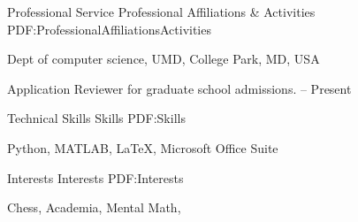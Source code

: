 \documentclass[letterpaper,MMMyyyy,nonstopmode]{simpleresumecv}
\begin{document}
\begin{Body}
{{%

\Section
{Professional Service}
{Professional Affiliations \& Activities}
{PDF:ProfessionalAffiliationsActivities}

\Entry
{Dept of computer science, UMD},
\newline
College Park, MD, USA

\Gap
\BulletItem
Application Reviewer for graduate school admissions.
\hfill
{} --
Present









\Section
{Technical Skills}
{Skills}
{PDF:Skills}

\Entry
Python,
MATLAB,
{\LaTeX},
Microsoft Office Suite

\BigGap



\Section
{Interests}
{Interests}
{PDF:Interests}

\Entry
Chess,
Academia,
Mental Math,






}}
\end{Body}
\end{document}
